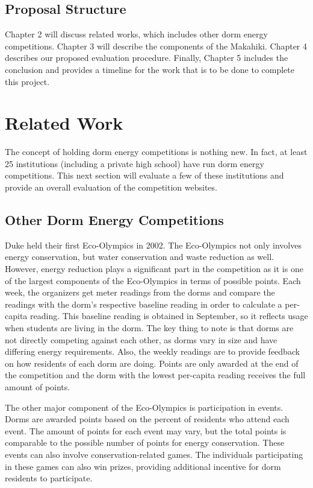 \section{Proposal Structure}

Chapter 2 will discuss related works, which includes other dorm energy competitions.  Chapter 3 will describe the components of the Makahiki.  Chapter 4 describes our proposed evaluation procedure.  Finally, Chapter 5 includes the conclusion and provides a timeline for the work that is to be done to complete this project.

\chapter{Related Work}
\label{relatedwork}

The concept of holding dorm energy competitions is nothing new.  In fact, at least 25 institutions (including a private high school) have run dorm energy competitions.  This next section will evaluate a few of these institutions and provide an overall evaluation of the competition websites.

\section{Other Dorm Energy Competitions}
\label{othercomps}

Duke held their first Eco-Olympics\cite{duke-eco-lympics} in 2002.  The Eco-Olympics not only involves energy conservation, but water conservation and waste reduction as well.  However, energy reduction plays a significant part in the competition as it is one of the largest components of the Eco-Olympics in terms of possible points.  Each week, the organizers get meter readings from the dorms and compare the readings with the dorm's respective baseline reading in order to calculate a per-capita reading.  This baseline reading is obtained in September, so it reflects usage when students are living in the dorm.   The key thing to note is that dorms are not directly competing against each other, as dorms vary in size and have differing energy requirements.  Also, the weekly readings are to provide feedback on how residents of each dorm are doing.  Points are only awarded at the end of the competition and the dorm with the lowest per-capita reading receives the full amount of points.

The other major component of the Eco-Olympics is participation in events.  Dorms are awarded points based on the percent of residents who attend each event.  The amount of points for each event may vary, but the total points is comparable to the possible number of points for energy conservation.  These events can also involve conservation-related games.  The individuals participating in these games can also win prizes, providing additional incentive for dorm residents to participate.

